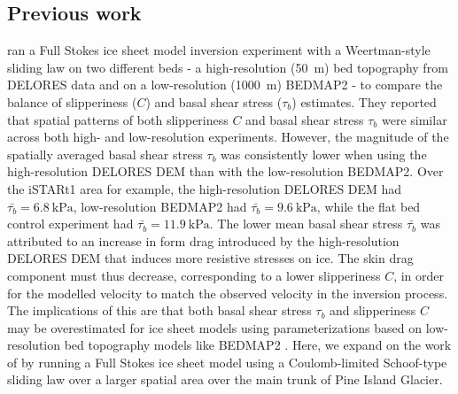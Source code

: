\subsection{Previous work} %

\citet{Kyrke-SmithRelevanceDetailBasal2018} ran a Full Stokes ice sheet model inversion experiment with a Weertman-style sliding law on two different beds - a high-resolution (\SI{50}{\metre}) bed topography from DELORES data \citep{BinghamDiverselandscapesPine2017} and on a low-resolution (\SI{1000}{\metre}) BEDMAP2 \citep{FretwellBedmap2improvedice2013} - to compare the balance of slipperiness ($C$) and basal shear stress ($\tau_b$) estimates.
They reported that spatial patterns of both slipperiness $C$ and basal shear stress $\tau_b$ were similar across both high- and low-resolution experiments.
However, the magnitude of the spatially averaged basal shear stress $\tau_b$ was consistently lower when using the high-resolution DELORES \gls{DEM} than with the low-resolution BEDMAP2.
Over the iSTARt1 area for example, the high-resolution DELORES \gls{DEM} had $\bar{\tau_b} = \SI{6.8}{\kilo\pascal}$, low-resolution BEDMAP2 had $\bar{\tau_b} = \SI{9.6}{\kilo\pascal}$, while the flat bed control experiment had $\bar{\tau_b} = \SI{11.9}{\kilo\pascal}$.
The lower mean basal shear stress $\bar{\tau_b}$ was attributed to an increase in form drag introduced by the high-resolution DELORES DEM that induces more resistive stresses on ice.
The skin drag component must thus decrease, corresponding to a lower slipperiness $C$, in order for the modelled velocity to match the observed velocity in the inversion process.
The implications of this are that both basal shear stress $\tau_b$ and slipperiness $C$ may be overestimated for ice sheet models using parameterizations based on low-resolution bed topography models like BEDMAP2 \citep{Kyrke-SmithRelevanceDetailBasal2018}.
Here, we expand on the work of \citet{Kyrke-SmithRelevanceDetailBasal2018} by running a Full Stokes ice sheet model \citep{LarourContinentalscalehigh2012} using a Coulomb-limited Schoof-type sliding law \citep{JoughinRegularizedCoulombFriction2019,Schoofeffectcavitationglacier2005} over a larger spatial area over the main trunk of Pine Island Glacier.









